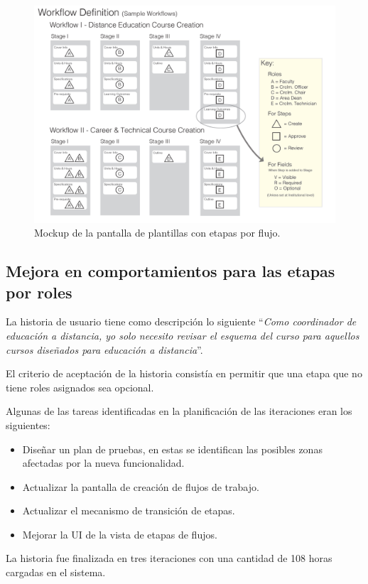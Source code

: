 \begin{figure}[H]
\centering
\includegraphics[width=125mm,scale=1]{Capitulos/DesarrollodelaAplicacion/Imagenes/workflow_template_stage}
\caption{Mockup de la pantalla de plantillas con etapas por flujo.}
  \label{workflow_template_stage}
\end{figure}

\subsection{Mejora en comportamientos para las etapas por roles}
La historia de usuario tiene como descripción lo siguiente \enquote{\textit{Como coordinador de educación a distancia, yo solo necesito revisar el esquema del curso para aquellos cursos diseñados para educación a distancia}}.

El criterio de aceptación de la historia consistía en permitir que una etapa que no tiene roles asignados sea opcional.

Algunas de las tareas identificadas en la planificación de las iteraciones eran los siguientes:
\begin{itemize}
	\item Diseñar un plan de pruebas, en estas se identifican las posibles zonas afectadas por la nueva funcionalidad.
	\item Actualizar la pantalla de creación de flujos de trabajo.
	\item Actualizar el mecanismo de transición de etapas.
	\item Mejorar la UI de la vista de etapas de flujos.
\end{itemize}

La historia fue finalizada en tres iteraciones con una cantidad de 108 horas cargadas en el sistema.


